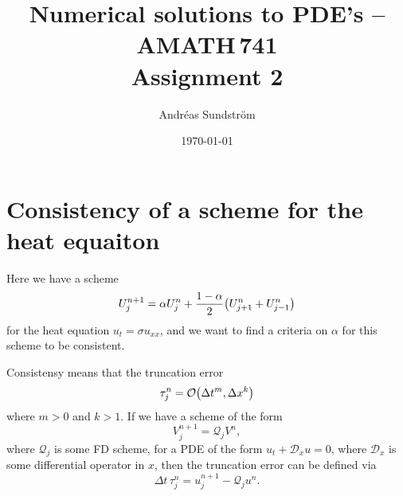 \documentclass[11pt,letter, swedish, english
]{article}
\newcommand{\Dx}{\ensuremath{\Delta{x}}}
\newcommand{\Dt}{\ensuremath{\Delta{t}}}
\begin{document}

\title{Numerical solutions to PDE's -- AMATH\,741 \\
Assignment 2}
\author{Andréas Sundström}
\date{\today}

\maketitle



\section{Consistency of a scheme for the heat equaiton}
Here we have a scheme
\begin{equation}
U_j^{n+1}=\alpha U_j^n+\frac{1-\alpha}{2}\qty(U_{j+1}^n+U_{j-1}^n)
\end{equation}
for the heat equation $u_t=\sigma u_{xx}$, and we want to find a
criteria on $\alpha$ for this scheme to be consistent.

Consistensy means that the truncation error
\begin{equation}
\tau_j^n=\order{\Dt^m, \Dx^k}
\end{equation}
where $m>0$ and $k>1$. 
If we have a scheme of the form
\begin{equation}
V^{n+1}_j=\mathcal{Q}_jV^n,
\end{equation}
where $\mathcal{Q}_j$ is some FD scheme, for a PDE of the form
$u_t+\mathcal{D}_xu=0$, where $\mathcal{D}_x$ is some differential
operator in $x$, then the truncation error can be defined via
\begin{equation}
\Dt\,\tau_j^{n}=u_j^{n+1}-\mathcal{Q}_ju^n.
\end{equation}
\end{document}
